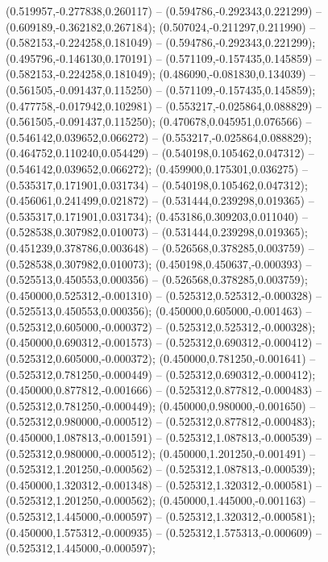  (0.519957,-0.277838,0.260117) -- (0.594786,-0.292343,0.221299) -- (0.609189,-0.362182,0.267184);
 (0.507024,-0.211297,0.211990) -- (0.582153,-0.224258,0.181049) -- (0.594786,-0.292343,0.221299);
 (0.495796,-0.146130,0.170191) -- (0.571109,-0.157435,0.145859) -- (0.582153,-0.224258,0.181049);
 (0.486090,-0.081830,0.134039) -- (0.561505,-0.091437,0.115250) -- (0.571109,-0.157435,0.145859);
 (0.477758,-0.017942,0.102981) -- (0.553217,-0.025864,0.088829) -- (0.561505,-0.091437,0.115250);
 (0.470678,0.045951,0.076566) -- (0.546142,0.039652,0.066272) -- (0.553217,-0.025864,0.088829);
 (0.464752,0.110240,0.054429) -- (0.540198,0.105462,0.047312) -- (0.546142,0.039652,0.066272);
 (0.459900,0.175301,0.036275) -- (0.535317,0.171901,0.031734) -- (0.540198,0.105462,0.047312);
 (0.456061,0.241499,0.021872) -- (0.531444,0.239298,0.019365) -- (0.535317,0.171901,0.031734);
 (0.453186,0.309203,0.011040) -- (0.528538,0.307982,0.010073) -- (0.531444,0.239298,0.019365);
 (0.451239,0.378786,0.003648) -- (0.526568,0.378285,0.003759) -- (0.528538,0.307982,0.010073);
 (0.450198,0.450637,-0.000393) -- (0.525513,0.450553,0.000356) -- (0.526568,0.378285,0.003759);
 (0.450000,0.525312,-0.001310) -- (0.525312,0.525312,-0.000328) -- (0.525513,0.450553,0.000356);
 (0.450000,0.605000,-0.001463) -- (0.525312,0.605000,-0.000372) -- (0.525312,0.525312,-0.000328);
 (0.450000,0.690312,-0.001573) -- (0.525312,0.690312,-0.000412) -- (0.525312,0.605000,-0.000372);
 (0.450000,0.781250,-0.001641) -- (0.525312,0.781250,-0.000449) -- (0.525312,0.690312,-0.000412);
 (0.450000,0.877812,-0.001666) -- (0.525312,0.877812,-0.000483) -- (0.525312,0.781250,-0.000449);
 (0.450000,0.980000,-0.001650) -- (0.525312,0.980000,-0.000512) -- (0.525312,0.877812,-0.000483);
 (0.450000,1.087813,-0.001591) -- (0.525312,1.087813,-0.000539) -- (0.525312,0.980000,-0.000512);
 (0.450000,1.201250,-0.001491) -- (0.525312,1.201250,-0.000562) -- (0.525312,1.087813,-0.000539);
 (0.450000,1.320312,-0.001348) -- (0.525312,1.320312,-0.000581) -- (0.525312,1.201250,-0.000562);
 (0.450000,1.445000,-0.001163) -- (0.525312,1.445000,-0.000597) -- (0.525312,1.320312,-0.000581);
 (0.450000,1.575312,-0.000935) -- (0.525312,1.575313,-0.000609) -- (0.525312,1.445000,-0.000597);

